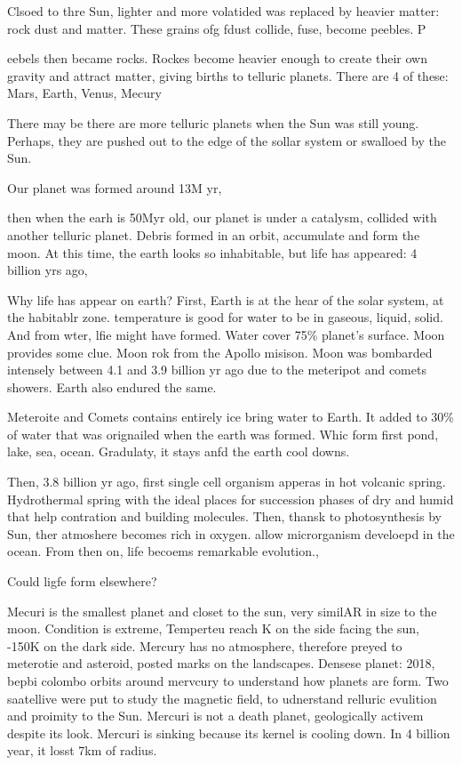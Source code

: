 Clsoed to thre Sun, lighter and more volatided was replaced by heavier matter: rock dust and matter. These grains ofg fdust collide, fuse, become peebles. P{eebels then became rocks. Rockes become heavier enough to create their own gravity and attract matter, giving births to telluric planets. There are 4 of these: Mars, Earth, Venus, Mecury

There may be there are more telluric planets when the Sun was still young. Perhaps, they are pushed out to the edge of the sollar system or swalloed by the Sun. 

Our planet was formed around 13M yr, 

then when the earh is 50Myr old, our planet is under a catalysm, collided with another telluric planet. Debris formed in an orbit, accumulate and form the moon. At this time, the earth looks so inhabitable, but life has appeared: 4 billion yrs ago,  

Why life has appear on earth?
First, Earth is at the hear of the solar system, at the habitablr zone. temperature is good for water to be in gaseous, liquid, solid.
And from wter, lfie might have formed. 
Water cover 75\% planet's surface. Moon provides some clue. Moon rok from the Apollo misison. Moon was bombarded intensely between 4.1 and 3.9 billion yr ago due to the meteripot and comets showers. Earth also endured the same.

Meteroite and Comets contains entirely ice bring water to Earth. It added to 30\% of water that was orignailed when the earth was formed. Whic form first pond, lake, sea, ocean. Gradulaty, it stays anfd the earth cool downs.

Then, 3.8 billion yr ago, first single cell organism apperas in hot volcanic spring. Hydrothermal spring with the ideal places for succession phases of dry and humid that help contration and building molecules.  Then, thansk to photosynthesis by Sun, ther atmoshere becomes rich in oxygen. allow microrganism develoepd in the ocean. From then on, life becoems remarkable evolution.,

Could ligfe form elsewhere?

Mecuri is the smallest planet and closet to the sun, very similAR in size to the moon. Condition is extreme, Temperteu reach K on the side facing the sun, -150K on the dark side. Mercury has no atmosphere, therefore preyed to meterotie and asteroid, posted marks on the landscapes.
Densese planet: 2018, bepbi colombo orbits around mervcury to understand how planets are form. Two saatellive were put to study the magnetic field, to udnerstand relluric evulition and proimity to the Sun. Mercuri is not a death planet, geologically activem  despite its look. Mercuri is sinking because its kernel is cooling down. In 4 billion year, it losst 7km of radius. 

}

